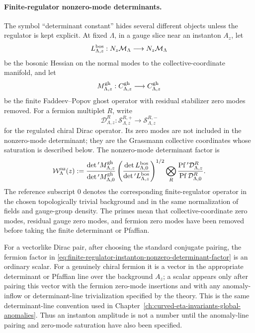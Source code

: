 \paragraph{Finite-regulator nonzero-mode determinants.}
The symbol ``determinant constant'' hides several different objects unless
the regulator is kept explicit.  At fixed \(\Lambda\), in a gauge slice near
an instanton \(A_z\), let
\[
  L_{\Lambda,z}^{\rm bos}:N_z\mathcal M_\Lambda\longrightarrow
  N_z\mathcal M_\Lambda
\]
be the bosonic Hessian on the normal modes to the collective-coordinate
manifold, and let
\[
  M_{\Lambda,z}^{\rm gh}:C_{\Lambda,z}^{\rm gh}\longrightarrow
  C_{\Lambda,z}^{\rm gh}
\]
be the finite Faddeev--Popov ghost operator with residual stabilizer zero
modes removed.  For a fermion multiplet \(R\), write
\[
  \mathcal D_{\Lambda,z}^{R}:\mathcal S_{\Lambda,z}^{R,+}
  \longrightarrow \mathcal S_{\Lambda,z}^{R,-}
\]
for the regulated chiral Dirac operator.  Its zero modes are not included in
the nonzero-mode determinant; they are the Grassmann collective coordinates
whose saturation is described below.  The nonzero-mode determinant factor is
\begin{equation}
  \mathcal W_{\Lambda}^{\rm nz}(z)
  :=
  \frac{\det{}' M_{\Lambda,z}^{\rm gh}}
       {\det{}' M_{\Lambda,0}^{\rm gh}}
  \left(
    \frac{\det L_{\Lambda,0}^{\rm bos}}
         {\det{}' L_{\Lambda,z}^{\rm bos}}
  \right)^{1/2}
  \bigotimes_R
  \frac{\operatorname{Pf}{}' \mathcal D_{\Lambda,z}^{R}}
       {\operatorname{Pf} \mathcal D_{\Lambda,0}^{R}} .
  \label{eq:finite-regulator-instanton-nonzero-determinant-factor}
\end{equation}
The reference subscript \(0\) denotes the corresponding finite-regulator
operator in the chosen topologically trivial background and in the same
normalization of fields and gauge-group density.  The primes mean that
collective-coordinate zero modes, residual gauge zero modes, and fermion zero
modes have been removed before taking the finite determinant or Pfaffian.

For a vectorlike Dirac pair, after choosing the standard conjugate pairing,
the fermion factor in
\eqref{eq:finite-regulator-instanton-nonzero-determinant-factor} is an
ordinary scalar.  For a genuinely chiral fermion it is a vector in the
appropriate determinant or Pfaffian line over the background \(A_z\); a
scalar appears only after pairing this vector with the fermion zero-mode
insertions and with any anomaly-inflow or determinant-line trivialization
specified by the theory.  This is the same determinant-line convention used
in Chapter~\ref{ch:curved-eta-invariants-global-anomalies}.  Thus an instanton
amplitude is not a number until the anomaly-line pairing and zero-mode
saturation have also been specified.

